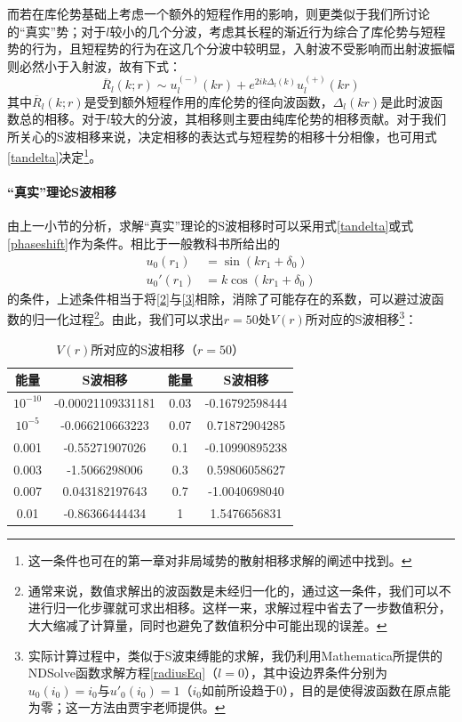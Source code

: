 \documentclass[cs4size,titlepage,twoside]{ctexart}
\begin{document}
而若在库伦势基础上考虑一个额外的短程作用的影响，则更类似于我们所讨论的“真实”势；对于$l$较小的几个分波，考虑其长程的渐近行为综合了库伦势与短程势的行为，且短程势的行为在这几个分波中较明显，入射波不受影响而出射波振幅则必然小于入射波，故有下式\cite{GKYTM}：
\begin{equation}
	\overline{R}_l(k;r)\sim u_l^{(-)}(kr)+e^{2ik\Delta_l(k)}u_l^{(+)}(kr)
\end{equation}
其中$\overline{R}_l(k;r)$是受到额外短程作用的库伦势的径向波函数，$\Delta_l(kr)$是此时波函数总的相移。对于$l$较大的分波，其相移则主要由纯库伦势的相移贡献。对于我们所关心的S波相移来说，决定相移的表达式与短程势的相移十分相像，也可用式\eqref{tandelta}决定\footnote{这一条件也可在\cite{nonlocal}的第一章对非局域势的散射相移求解的阐述中找到。}。
\paragraph{“真实”理论S波相移}
由上一小节的分析，求解“真实”理论的S波相移时可以采用式\eqref{tandelta}或式\eqref{phaseshift}作为条件。相比于一般教科书\cite{Griffiths,Chen}所给出的
\begin{align}
	u_0(r_1)&=\sin(kr_1+\delta_0) \label{2}\\
  u_0'(r_1) &= k\cos(kr_1+\delta_0)\label{3}
\end{align}
的条件，上述条件相当于将\eqref{2}与\eqref{3}相除，消除了可能存在的系数，可以避过波函数的归一化过程\footnote{通常来说，数值求解出的波函数是未经归一化的，通过这一条件，我们可以不进行归一化步骤就可求出相移。这样一来，求解过程中省去了一步数值积分，大大缩减了计算量，同时也避免了数值积分中可能出现的误差。}。由此，我们可以求出$r=50$处$V(r)$所对应的S波相移\footnote{实际计算过程中，类似于S波束缚能的求解，我仍利用Mathematica所提供的NDSolve函数求解方程\eqref{radiusEq}（$l=0$），其中设边界条件分别为$u_0(i_0)=i_0$与$u'_0(i_0)=1$（$i_0$如前所设趋于0），目的是使得波函数在原点能为零；这一方法由贾宇老师提供。}：
\begin{table}[!htbp]
	\centering
	\begin{tabular}{|cccc|}
		\hline
		能量     & S波相移        & 能量 & S波相移     \\
		\hline
		$10^{-10}$ & -0.00021109331181 & 0.03   & -0.16792598444 \\
		$10^{-5}$  & -0.066210663223   & 0.07   & 0.71872904285  \\
		0.001      & -0.55271907026    & 0.1    & -0.10990895238 \\
		0.003      & -1.5066298006     & 0.3    & 0.59806058627  \\
		0.007      & 0.043182197643    & 0.7    & -1.0040698040  \\
		0.01       & -0.86366444434    & 1      & 1.5476656831   \\
		\hline
	\end{tabular}
	\caption{$V(r)$所对应的S波相移（$r=50$）}
\end{table}
\end{document}
